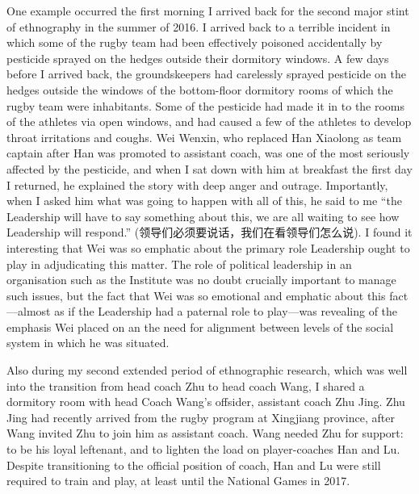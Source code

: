 \begin{CJK}{UTF8}{gbsn}
One example occurred the first morning I arrived back for the second major stint of ethnography in the summer of 2016. I arrived back to a terrible incident in which some of the rugby team had been effectively poisoned accidentally by pesticide sprayed on the hedges outside their dormitory windows.  A few days before I arrived back, the groundskeepers had carelessly sprayed pesticide on the hedges outside the windows of the bottom-floor dormitory rooms of which the rugby team were inhabitants.  Some of the pesticide had made it in to the rooms of the athletes via open windows, and had caused a few of the athletes to develop throat irritations and coughs.  Wei Wenxin, who replaced Han Xiaolong as team captain after Han was promoted to assistant coach, was one of the most seriously affected by the pesticide, and when I sat down with him at breakfast the first day I returned, he explained the story with deep anger and outrage.  Importantly, when I asked him what was going to happen with all of this, he said to me ``the Leadership will have to say something about this, we are all waiting to see how Leadership will respond.'' (领导们必须要说话，我们在看领导们怎么说). I found it interesting that Wei was so emphatic about the primary role Leadership ought to play in adjudicating this matter.  The role of political leadership in an organisation such as the Institute was no doubt crucially important to manage such issues, but the fact that Wei was so emotional and emphatic about this fact---almost as if the Leadership had a paternal role to play---was revealing of the emphasis Wei placed on an the need for alignment between levels of the social system in which he was situated.

Also during my second extended period of ethnographic research, which was well into the transition from head coach Zhu to head coach Wang, I shared a dormitory room with head Coach Wang's offsider, assistant coach Zhu Jing.  Zhu Jing had recently arrived from the rugby program at Xingjiang province, after Wang invited Zhu to join him as assistant coach.   Wang needed Zhu for support: to be his loyal leftenant, and to lighten the load on player-coaches Han and Lu. Despite transitioning to the official position of coach, Han and Lu were still required to train and play, at least until the National Games in 2017.


\end{CJK}
